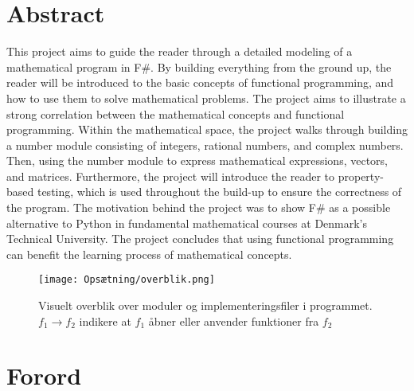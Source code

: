\documentclass{article}
\newcommand{\newchapter}{
    \cleardoublepage
    \ifthenelse{\isodd{\value{page}}}{}{\hbox{}\newpage}
}
\begin{document}

\pagestyle{plain}

\section*{Abstract}
This project aims to guide the reader through a detailed modeling of a mathematical program in F\#. By building everything from the ground up, the reader will be introduced to the basic concepts of functional programming, and how to use them to solve mathematical problems. The project aims to illustrate a strong correlation between the mathematical concepts and functional programming. Within the mathematical space, the project walks through building a number module consisting of integers, rational numbers, and complex numbers. Then, using the number module to express mathematical expressions, vectors, and matrices. Furthermore, the project will introduce the reader to property-based testing, which is used throughout the build-up to ensure the correctness of the program. The motivation behind the project was to show F\# as a possible alternative to Python in fundamental mathematical courses at Denmark's Technical University. The project concludes that using functional programming can benefit the learning process of mathematical concepts.




\newpage
\begin{figure}[h]
    \centering
    \texttt{[image: Opsætning/overblik.png]}
    \caption{Visuelt overblik over moduler og implementeringsfiler i programmet. $f_1 \to f_2$ indikere at $f_1$ åbner eller anvender funktioner fra $f_2$}
    \label{fig:svg_example}
\end{figure}

\newchapter
\section*{Forord}


\newchapter
\tableofcontents
\newchapter

\newchapter

\newchapter

\newchapter

\newchapter

\newchapter


\newchapter

\newchapter




\newpage
\printbibliography

\newpage

\end{document}
